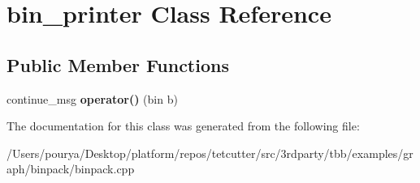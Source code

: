 \hypertarget{classbin__printer}{}\section{bin\+\_\+printer Class Reference}
\label{classbin__printer}
\subsection*{Public Member Functions}
\begin{DoxyCompactItemize}
\item 
\hypertarget{classbin__printer_a0889f006495ba6c25c7bfa226324e61e}{}continue\+\_\+msg {\bfseries operator()} (bin b)\label{classbin__printer_a0889f006495ba6c25c7bfa226324e61e}

\end{DoxyCompactItemize}


The documentation for this class was generated from the following file\+:\begin{DoxyCompactItemize}
\item 
/\+Users/pourya/\+Desktop/platform/repos/tetcutter/src/3rdparty/tbb/examples/graph/binpack/binpack.\+cpp\end{DoxyCompactItemize}
